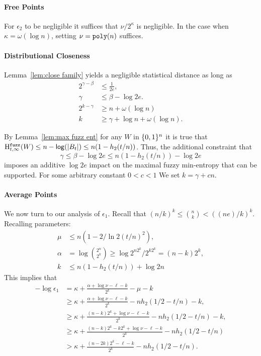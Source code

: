\paragraph{Free Points}
For $\epsilon_2$ to be negligible it suffices that $\nu/2^\kappa$ is negligible.  In the case when $\kappa = \omega(\log{n})$, setting $\nu = \mathtt{poly}(n)$ suffices.
\paragraph{Distributional Closeness}
 Lemma~\ref{lem:close family} yields a negligible statistical distance as long as 
\begin{align*}
2^{\gamma - \beta} &\le \frac{1}{2e},\\
 \gamma &\le \beta -\log{2e}.\\
2^{k-\gamma}&\ge n+\omega(\log n)\\
k &\ge \gamma + \log{n+ \omega(\log{n})}.
\end{align*}


By Lemma~\ref{lem:max fuzz ent} for any $W$ in $\{0, 1\}^n$ it is true that $\mathrm{H}^{\mathtt{fuzz}}_{t,\infty}(W) \le n -\mathsf{log}\!\left(|B_t|\right) \le n(1-h_2(t/n))$.  Thus, the additional constraint that 
\[
\gamma \le \beta - \log{2e}
\le n(1-h_2(t/n)) - \log{2e}\] imposes an additive $\log{2e}$ impact on the maximal fuzzy min-entropy that can be supported. 
For some arbitrary constant $0<c < 1$ We set $k = \gamma + cn$. 

\paragraph{Average Points} 
We now turn to our analysis of $\epsilon_1$.  Recall that $(n/k)^k \le {n\choose k} < ((ne)/k)^k$.  Recalling parameters: 
\begin{align*}
\mu&\le n(1-2/\ln 2 (t/n)^2),\\
\alpha &= \log{2^n\choose 2^k} \ge \log{2^{n2^k} /2^{k2^k}} = (n-k)2^k,\\
k &\le n(1-h_2(t/n)) + \log{2n}
\end{align*}
This implies that 
\begin{align*}
-\log{\epsilon_1}&= \kappa+\frac{\alpha +\log{\nu}-\ell-k}{2^k} - \mu -k\\
&\ge  \kappa+\frac{\alpha +\log{\nu}-\ell-k}{2^k} - nh_2(1/2-t/n) - k,\\
&\ge  \kappa+\frac{(n-k)2^k +\log{\nu}-\ell-k}{2^k} - nh_2(1/2-t/n) - k,\\
&\ge  \kappa+\frac{(n-k)2^k-k2^{k} +\log{\nu}-\ell-k}{2^k} - nh_2(1/2-t/n)\\
&>  \kappa+\frac{(n-2k)2^k-\ell-k}{2^k} - nh_2(1/2-t/n) .
\end{align*}

